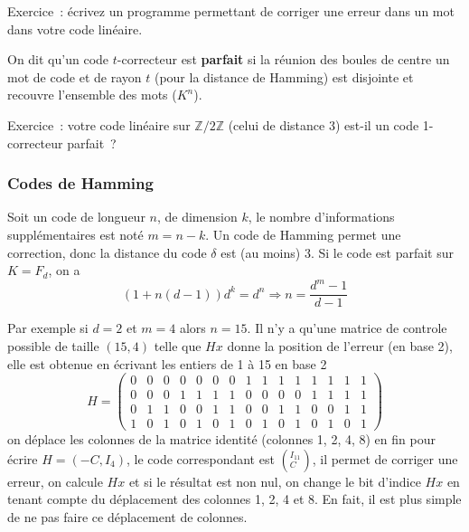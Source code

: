 \documentclass[a4paper,11pt]{article}
\begin{document}
\begin{giacjshere}
Exercice~: écrivez un programme permettant de corriger une erreur
dans un mot dans votre code linéaire.

On dit qu'un code $t$-correcteur est 
{\bf parfait} si la réunion des boules
de centre un mot de code et de rayon $t$ (pour la distance de Hamming)
est disjointe et recouvre l'ensemble des mots ($K^n$).

Exercice~: votre code linéaire sur $\mathbb{Z}/2\mathbb{Z}$ (celui de distance 3) 
est-il un code 1-correcteur parfait~?

\subsubsection{Codes de Hamming}
Soit un code de longueur $n$, de dimension $k$, le nombre
d'informations suppl\'ementaires est not\'e $m=n-k$. Un code
de Hamming 
permet une correction, donc la distance du code
$\delta$ est (au moins) 3. Si le code est parfait sur $K=F_d$, on a 
$$ (1+n(d-1))d^k=d^{n} \Rightarrow n=\frac{d^m-1}{d-1}$$

Par exemple si $d=2$ et $m=4$ alors $n=15$. 
Il n'y a qu'une matrice de controle possible de taille
$(15,4)$ telle que $Hx$ donne la position de l'erreur (en base 2),
elle est obtenue en \'ecrivant les entiers de 1 \`a 15 en base 2
$$ H=\left( \begin{array}{ccccccccccccccc}
0 & 0 & 0 & 0 & 0 & 0 & 0 & 1 & 1 & 1 & 1 & 1 & 1 & 1 & 1 \\
0 & 0 & 0 & 1 & 1 & 1 & 1 & 0 & 0 & 0 & 0 & 1 & 1 & 1 & 1 \\
0 & 1 & 1 & 0 & 0 & 1 & 1 & 0 & 0 & 1 & 1 & 0 & 0 & 1 & 1 \\
1 & 0 & 1 & 0 & 1 & 0 & 1 & 0 & 1 & 0 & 1 & 0 & 1 & 0 & 1
 \end{array} \right)$$
on d\'eplace les colonnes de la matrice identit\'e 
(colonnes 1, 2, 4, 8)
en fin pour \'ecrire $H=(-C,I_4)$, le code correspondant est
$\left( ^{I_{11}} _C \right)$, il permet de corriger une erreur,
on calcule $Hx$ et si le r\'esultat est non nul, on change le
bit d'indice $Hx$ en tenant compte du d\'eplacement des colonnes
1, 2, 4 et 8. En fait, il est plus simple de ne pas faire ce
d\'eplacement de colonnes.


\end{giacjshere}
\end{document}
